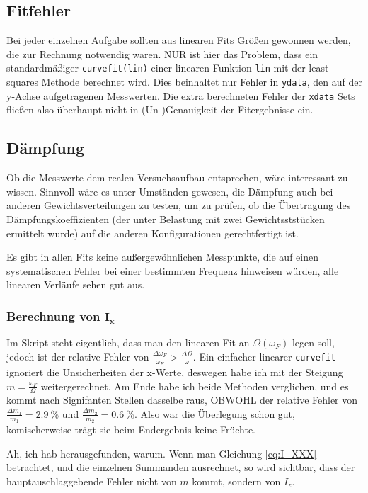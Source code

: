 \subsection{Fitfehler}
Bei jeder einzelnen Aufgabe sollten aus linearen Fits Größen gewonnen werden, die zur Rechnung notwendig waren. NUR ist hier das Problem, dass ein standardmäßiger \verb|curvefit(lin)| einer linearen Funktion \verb|lin| mit der least-squares Methode berechnet wird. Dies beinhaltet nur Fehler in \verb|ydata|, den auf der y-Achse aufgetragenen Messwerten. Die extra berechneten Fehler der \verb|xdata| Sets fließen also überhaupt nicht in (Un-)Genauigkeit der Fitergebnisse ein. 

\subsection{Dämpfung}
Ob die Messwerte dem realen Versuchsaufbau entsprechen, wäre interessant zu wissen.  Sinnvoll wäre es unter Umständen gewesen, die Dämpfung auch bei anderen Gewichtsverteilungen zu testen, um zu prüfen, ob die Übertragung des Dämpfungskoeffizienten (der unter Belastung mit zwei Gewichtsststücken ermittelt wurde) auf die anderen Konfigurationen gerechtfertigt ist.

Es gibt in allen Fits keine außergewöhnlichen Messpunkte, die auf einen systematischen Fehler bei einer bestimmten Frequenz hinweisen würden, alle linearen Verläufe sehen gut aus. 
\subsubsection[\texorpdfstring{Berechnung von \(I_x\)}{Berechnung von I x}]{Berechnung von \(\boldsymbol{I_x}\)}
Im Skript steht eigentlich, dass man den linearen Fit an \(\Omega(\omega_F)\) legen soll, jedoch ist der relative Fehler von \(\frac{\Delta\omega_F}{\omega_F}>\frac{\Delta\Omega}{\omega}\). Ein einfacher linearer \verb|curvefit| ignoriert die Unsicherheiten der x-Werte, deswegen habe ich mit der Steigung \(m=\frac{\omega_F}{\Omega}\) weitergerechnet. Am Ende habe ich beide Methoden verglichen, und es kommt nach Signifanten Stellen dasselbe raus, OBWOHL der relative Fehler von \(\frac{\Delta m_1}{m_1}=\qty{2.9}{\percent}\) und \(\frac{\Delta m_2}{m_2}=\qty{0.6}{\percent}\). 
Also war die Überlegung schon gut, komischerweise trägt sie beim Endergebnis keine Früchte.

Ah, ich hab herausgefunden, warum. Wenn man Gleichung \cref{eq:I_XXX} betrachtet, und die einzelnen Summanden ausrechnet, so wird sichtbar, dass der hauptauschlaggebende Fehler nicht von \(m\) kommt, sondern von \(I_z\). 
